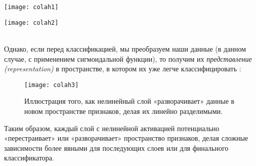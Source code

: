 \begin{minipage}{0.35\textwidth}
    \texttt{[image: colah1]}
    \label{fig:colah1}
\end{minipage}
\hspace{80pt}
\begin{minipage}{0.35\textwidth}
    \texttt{[image: colah2]}
    \label{fig:colah2}
\end{minipage}\\

Однако, если перед классификацией, мы преобразуем наши данные 
(в данном случае, с применением сигмоидальной функции), 
то получим их \textit{представление (representation)} в 
пространстве, в котором их уже легче классифицировать \cite{colah}:

\begin{figure}[h!]
    \centering
    \texttt{[image: colah3]}
    \caption{Иллюстрация того, как нелинейный слой «разворачивает» 
    данные в новом пространстве признаков, делая их линейно разделимыми.}
    \label{fig:colah3}
\end{figure}

Таким образом, каждый слой с нелинейной активацией потенциально «перестраивает» или 
«разворачивает» пространство признаков, делая сложные зависимости более явными для 
последующих слоев или для финального классификатора.









